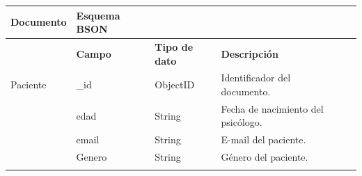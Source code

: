 \begin{table}[htpb]
\centering
\begin{tabularx}{\textwidth}{|l|X|X|X|X|}
\hline
\rowcolor[gray]{0.9}\textbf{Documento}         & \textbf{Esquema BSON                                                                      } &                                                                          &                                                                                                                                                                                  \\ \hline
                  & \textbf{Campo}                                                                              & \textbf{Tipo de dato}                                                             & \textbf{Descripción                                                                                                                                                                     } \\ \hline
Paciente          & \_id                                                                               & ObjectID                                                                 & Identificador del documento.                                                                                                                                                     \\ \hline
\multirow{8}{*}{} & edad                                                                               & String                                                                   & Fecha de nacimiento del psicólogo.                                                                                                                                               \\ \cline{2-4} 
                  & email                                                                              & String                                                                   & E-mail del paciente.                                                                                                                                                             \\ \cline{2-4} 
                  & Genero                                                                             & String                                                                   & Género del paciente.                                                                                                                                                             \\ \cline{2-4} 

\end{tabularx}
\end{table}
